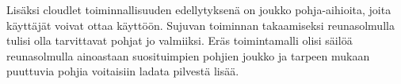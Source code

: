 Lisäksi cloudlet toiminnallisuuden edellytyksenä on joukko pohja-aihioita, joita käyttäjät voivat ottaa käyttöön. 
Sujuvan toiminnan takaamiseksi reunasolmulla tulisi olla tarvittavat pohjat jo valmiiksi. 
Eräs toimintamalli olisi säilöä reunasolmulla ainoastaan suosituimpien pohjien joukko ja tarpeen mukaan puuttuvia pohjia voitaisiin ladata pilvestä lisää.






